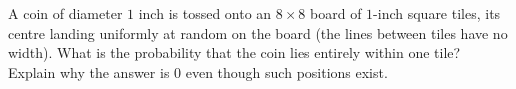 A coin of diameter $1$ inch is tossed onto an $8\times8$ board of $1$-inch square tiles, its centre landing uniformly at random on the board (the lines between tiles have no width). What is the probability that the coin lies entirely within one tile? Explain why the answer is $0$ even though such positions exist.
